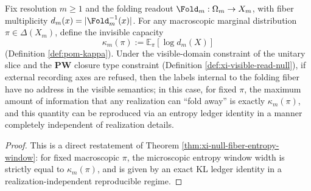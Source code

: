 \begin{theorem}\label{thm:xi-kappa-unique-carrier}
Fix resolution \(m\ge 1\) and the folding readout \(\Fold_m:\Omega_m\to X_m\), with fiber multiplicity \(d_m(x)=|\Fold_m^{-1}(x)|\).
For any macroscopic marginal distribution \(\pi\in\Delta(X_m)\), define the invisible capacity
\[
\kappa_m(\pi):=\mathbb{E}_{\pi}[\log d_m(X)]
\]
(Definition \ref{def:pom-kappa}).
Under the visible-domain constraint of the unitary slice and the \(\mathbf{PW}\) closure type constraint (Definition \ref{def:xi-visible-read-null}), if external recording axes are refused, then the labels internal to the folding fiber have no address in the visible semantics; in this case, for fixed \(\pi\), the maximum amount of information that any realization can ``fold away'' is exactly \(\kappa_m(\pi)\), and this quantity can be reproduced via an entropy ledger identity in a manner completely independent of realization details.
\end{theorem}

\begin{proof}
This is a direct restatement of Theorem \ref{thm:xi-null-fiber-entropy-window}: for fixed macroscopic \(\pi\), the microscopic entropy window width is strictly equal to \(\kappa_m(\pi)\), and is given by an exact KL ledger identity in a realization-independent reproducible regime.
\end{proof}

